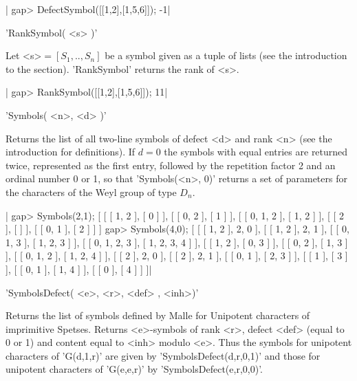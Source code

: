 |    gap> DefectSymbol([[1,2],[1,5,6]]);
    -1|


'RankSymbol( <s> )'

Let <s>$=[S_1,..,S_n]$  be a symbol given  as a tuple of  lists (see the
introduction to the section). 'RankSymbol' returns the rank of <s>.

|    gap> RankSymbol([[1,2],[1,5,6]]);
    11|


'Symbols( <n>, <d> )'

Returns  the list of all  two-line symbols of defect  <d> and rank <n> (see
the  introduction for definitions). If $d=0$ the symbols with equal entries
are  returned  twice,  represented  as  the  first  entry,  followed by the
repetition factor 2 and an ordinal number 0 or 1, so that 'Symbols(<n>, 0)'
returns  a set of parameters  for the characters of  the Weyl group of type
$D_n$.

|    gap> Symbols(2,1);
    [ [ [ 1, 2 ], [ 0 ] ], [ [ 0, 2 ], [ 1 ] ], [ [ 0, 1, 2 ], [ 1, 2 ] ],
      [ [ 2 ], [  ] ], [ [ 0, 1 ], [ 2 ] ] ]
    gap> Symbols(4,0);
    [ [ [ 1, 2 ], 2, 0 ], [ [ 1, 2 ], 2, 1 ],
      [ [ 0, 1, 3 ], [ 1, 2, 3 ] ], [ [ 0, 1, 2, 3 ], [ 1, 2, 3, 4 ] ],
      [ [ 1, 2 ], [ 0, 3 ] ], [ [ 0, 2 ], [ 1, 3 ] ],
      [ [ 0, 1, 2 ], [ 1, 2, 4 ] ], [ [ 2 ], 2, 0 ], [ [ 2 ], 2, 1 ],
      [ [ 0, 1 ], [ 2, 3 ] ], [ [ 1 ], [ 3 ] ], [ [ 0, 1 ], [ 1, 4 ] ],
      [ [ 0 ], [ 4 ] ] ]|


'SymbolsDefect( <e>, <r>, <def> , <inh>)'

Returns  the list of  symbols defined by  Malle for Unipotent characters of
imprimitive  Spetses. Returns <e>-symbols of  rank <r>, defect <def> (equal
to  0 or  1) and  content equal  to <inh>  modulo <e>. Thus the symbols for
unipotent  characters of  'G(d,1,r)' are  given by 'SymbolsDefect(d,r,0,1)'
and those for unipotent characters of 'G(e,e,r)' by
'SymbolsDefect(e,r,0,0)'.

